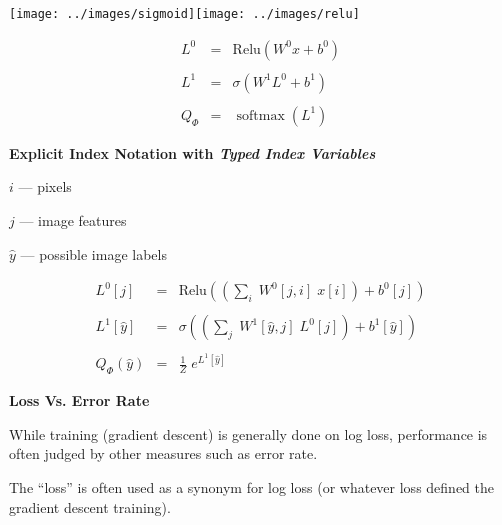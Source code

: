 \documentclass[landscape]{article}
\newcommand{\slide}[1]{
  \vfill
  \centerline{\Large\thepage}
  \eject
  \centerline{\bf #1}
  \vfill}
\DeclareMathOperator*{\argmin}{argmin}
\DeclareMathOperator*{\softmax}{softmax}
\newcommand{\ignore}[1]{}
\begin{document}
{\vfill
\centerline{\texttt{[image: ../images/sigmoid]}\hspace{1.0in}\texttt{[image: ../images/relu]}}

\vfill
\begin{eqnarray*}
  L^0 & = & \mathrm{Relu}(W^0 x + b^0) \\
  \\
  L^1 & = & \sigma(W^1 L^0 + b^1) \\
  \\
  Q_\Phi & = & \softmax(L^1)
\end{eqnarray*}

\slide{Explicit Index Notation with {\em Typed Index Variables}}


$i$ --- pixels

$j$ --- image features

$\hat{y}$ --- possible image labels

\vfill
\begin{eqnarray*}
  L^0[j] & = & \mathrm{Relu}\left(\left(\sum_i\;W^0[j,i] \;x[i]\right) + b^0[j]\right) \\
  \\
  L^1[\hat{y}] & = & \sigma\left(\left(\sum_j\;W^1[\hat{y},j]\;L^0[j]\right) + b^1[\hat{y}]\right) \\
  \\
  Q_\Phi(\hat{y}) & = & \frac{1}{Z} \;e^{L^1[\hat{y}]}
\end{eqnarray*}

\ignore{
\slide{Index Types are Too Often Ignored}
For example: in Goodfellow et al. we have:


\centerline{\texttt{[image: ../images/Notation]}}

\slide{Abstract Optimization Problems}

Training minimizes (perhaps regularized) loss on the training data.

\vfill
$$\Phi^* = \argmin_\Phi\;\frac{1}{N} \sum_n \ell(\Phi,x_n,y_n)$$

\vfill
We would really like to minimize loss on the population.

\vfill
\vfill
$$\Phi^* = \argmin_\Phi\; E_{(x,y) \sim {\cal P}}\;\;\ell(\Phi,x,y)$$
}

\slide{Loss Vs. Error Rate}
While training (gradient descent) is generally done on log loss, performance is often judged by other measures such as error rate.

\vfill
The ``loss'' is often used as a synonym for log loss (or whatever loss defined the gradient descent training).

}
\end{document}
